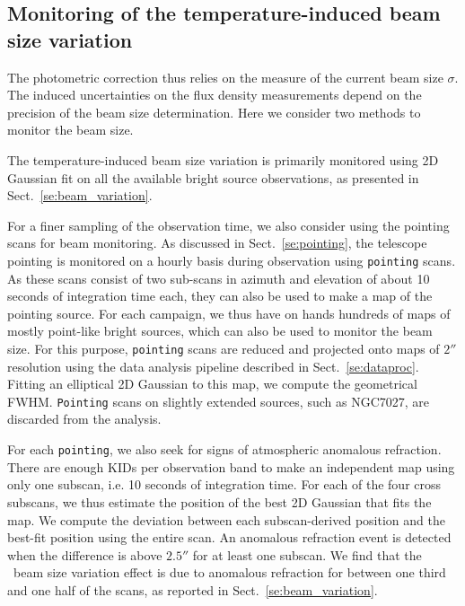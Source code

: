 
\subsection{Monitoring of the temperature-induced beam size variation}
\label{ap:beam_monitoring}

The photometric correction thus relies on the measure of the current beam size
$\sigma$. The induced uncertainties on the flux density measurements depend on
the precision of the beam size determination. Here we
consider two methods to monitor the beam size.

The temperature-induced beam size variation is primarily monitored
using 2D Gaussian fit on all the available bright source observations,
as presented in Sect.~\ref{se:beam_variation}. 

For a finer sampling of the observation time, we also consider using
the pointing scans for beam monitoring. As discussed in
Sect.~\ref{se:pointing}, the telescope pointing is
monitored on a hourly basis during observation using {\tt pointing}
scans. As these scans consist of two sub-scans in azimuth and
elevation of about 10 seconds of integration time each, they
can also be used to make a map of the pointing source. For each campaign,
we thus have on hands hundreds of maps of mostly point-like bright
sources, which can also be used to monitor the beam size. 
For this purpose, {\tt pointing} scans are reduced 
and projected onto maps of $2''$ resolution using
the data analysis pipeline described in Sect.~\ref{se:dataproc}.
Fitting an elliptical 2D Gaussian to this map, we compute the geometrical FWHM.%
{\tt Pointing} scans on {\lp slightly extended} sources, such as NGC7027,
are discarded from the analysis.

For each {\tt pointing}, we also seek for signs of atmospheric
anomalous refraction. There are
enough KIDs per observation band to make an independent map using only
one subscan, i.e. 10 seconds of integration time.
For each of the four cross subscans, we thus estimate the position of the best
2D Gaussian that fits the map. We compute the deviation between each
subscan-derived position and the best-fit position using the entire
scan. An anomalous refraction event is detected when the difference is
above $2.5''$ for at least one subscan. We find that the \afternoon\
beam size variation effect is due to anomalous refraction for
between one third and one half of the scans, as reported in
Sect.~\ref{se:beam_variation}.

